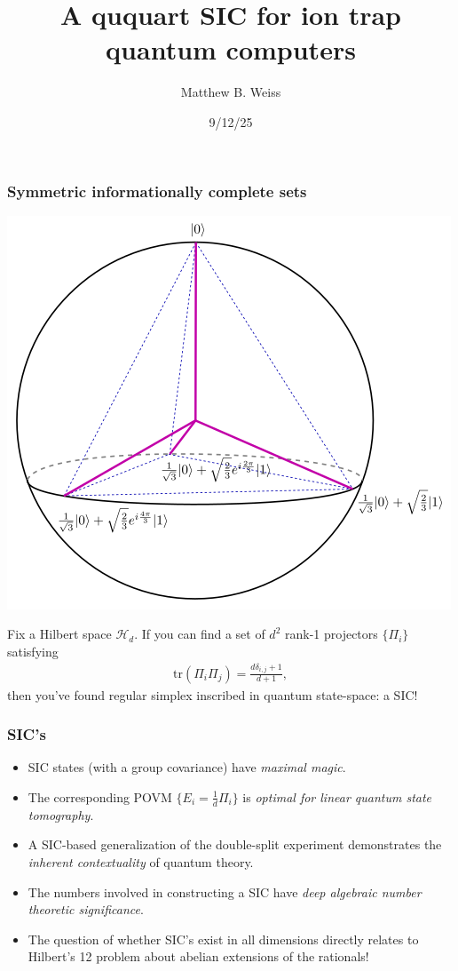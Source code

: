 \documentclass{beamer}
\title{A ququart SIC for ion trap quantum computers}
\author{Matthew B. Weiss}
\institute{UMB: QBism Group}
\date{9/12/25}
\newcommand{\tr}{{\text{tr}}}
\begin{document}
\frame{\titlepage}


\begin{frame}
\frametitle{Symmetric informationally complete sets}
\begin{center}
\includegraphics[scale=0.25]{img/qubit_sic}	
\end{center}
Fix a Hilbert space $\mathcal{H}_d$. If you can find a set of $d^2$ rank-1 projectors $\{\Pi_i\}$ satisfying
\begin{align}
	\tr(\Pi_{i}\Pi_{j})=\frac{d\delta_{i,j}+1}{d+1},
\end{align}
then you've found  regular simplex inscribed in quantum state-space: a SIC!
\end{frame}

\begin{frame}
\frametitle{SIC's}
\begin{itemize}
\item SIC states (with a group covariance) have \emph{maximal magic}.
\item The corresponding POVM $\{E_i = \frac{1}{d}\Pi_i\}$ is \emph{optimal for linear quantum state tomography}.
\item A SIC-based generalization of the double-split experiment demonstrates  the \emph{inherent contextuality} of quantum theory.
\item The numbers involved in constructing a SIC have \emph{deep algebraic number theoretic significance}. 
\item The question of whether SIC's exist in all dimensions directly relates to Hilbert's 12 problem about abelian extensions of the rationals!
\end{itemize}
\end{frame}
\end{document}
